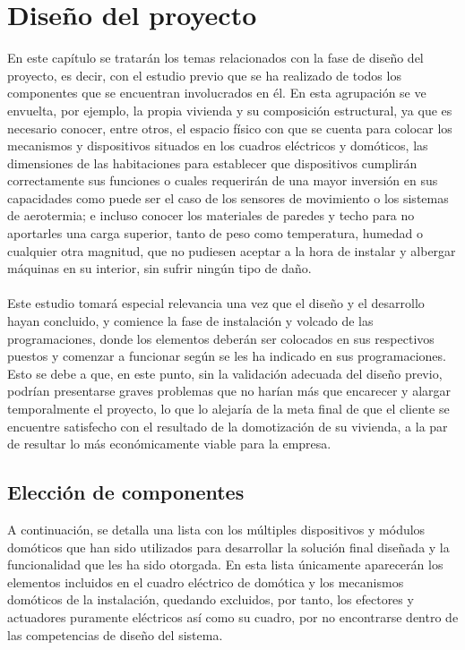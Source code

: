 \chapter{Diseño del proyecto}

En este capítulo se tratarán los temas relacionados con la fase de diseño del proyecto, es decir, con el estudio previo que se ha realizado de todos los componentes que se encuentran involucrados en él. En esta agrupación se ve envuelta, por ejemplo, la propia vivienda y su composición estructural, ya que es necesario conocer, entre otros, el espacio físico con que se cuenta para colocar los mecanismos y dispositivos situados en los cuadros eléctricos y domóticos, las dimensiones de las habitaciones para establecer que dispositivos cumplirán correctamente sus funciones o cuales requerirán de una mayor inversión en sus capacidades como puede ser el caso de los sensores de movimiento o los sistemas de aerotermia; e incluso conocer los materiales de paredes y techo para no aportarles una carga superior, tanto de peso como temperatura, humedad o cualquier otra magnitud, que no pudiesen aceptar a la hora de instalar y albergar máquinas en su interior, sin sufrir ningún tipo de daño.\\\\
Este estudio tomará especial relevancia una vez que el diseño y el desarrollo hayan concluido, y comience la fase de instalación y volcado de las programaciones, donde los elementos deberán ser colocados en sus respectivos puestos y comenzar a funcionar según se les ha indicado en sus programaciones. Esto se debe a que, en este punto, sin la validación adecuada del diseño previo, podrían presentarse graves problemas que no harían más que encarecer y alargar temporalmente el proyecto, lo que lo alejaría de la meta final de que el cliente se encuentre satisfecho con el resultado de la domotización de su vivienda, a la par de resultar lo más económicamente viable para la empresa.
\section{Elección de componentes}

A continuación, se detalla una lista con los múltiples dispositivos y módulos domóticos que han sido utilizados para desarrollar la solución final diseñada y la funcionalidad que les ha sido otorgada. En esta lista únicamente aparecerán los elementos incluidos en el cuadro eléctrico de domótica y los mecanismos domóticos de la instalación, quedando excluidos, por tanto, los efectores y actuadores puramente eléctricos así como su cuadro, por no encontrarse dentro de las competencias de diseño del sistema.


